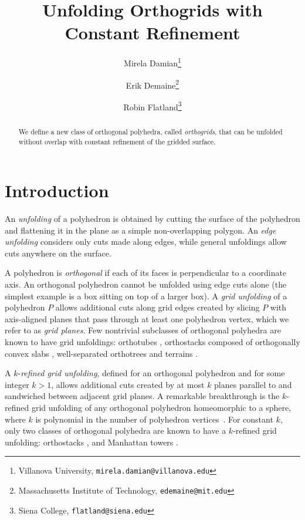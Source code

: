 \documentclass[11pt]{article}
\begin{document}
\title{Unfolding Orthogrids with Constant Refinement}
\author{
Mirela Damian\thanks{Villanova University, \tt{mirela.damian@villanova.edu}}
\and
Erik Demaine\thanks{Massachusetts Institute of Technology,  \tt{edemaine@mit.edu}}
\and
Robin Flatland\thanks{Siena College, \tt{flatland@siena.edu}}
}
\date{}
\maketitle


\begin{abstract}
We define a new class of orthogonal polyhedra, called \emph{orthogrids}, that can be unfolded without overlap with constant refinement of the gridded surface. 
\end{abstract}

\section{Introduction}
An \emph{unfolding} of a polyhedron is obtained by cutting the surface of the polyhedron and flattening it in the plane 
as a simple non-overlapping polygon. 
An \emph{edge unfolding} considers only cuts made along edges, while general unfoldings allow cuts anywhere on the surface. 

A polyhedron is \emph{orthogonal} if each of its faces is perpendicular to a coordinate axis.
An orthogonal polyhedron cannot be unfolded using edge cuts alone 
(the simplest example is a box sitting on top of a larger box). 
A \emph{grid unfolding} of a polyhedron $P$ allows additional cuts along grid edges created by slicing $P$ with 
axis-aligned planes that pass through at least one polyhedron vertex, which we refer to as \emph{grid planes}. Few nontrivial subclasses of orthogonal polyhedra are known to have grid unfoldings: orthotubes
\cite{Biedl-Demaine-Demaine-Lubiw-Overmars-O'Rourke-Robbins-Whitesides-1998},
orthostacks composed of orthogonally convex slabs
\cite{Damian-Meijer-2004-orthostacks}, 
well-separated orthotrees 
\cite{Damian-Flatland-Meijer-O'Rourke-2005-orthotrees} and
terrains
\cite{O'Rourke-2007-terrains}.

A $k$-\emph{refined grid unfolding}, defined for an orthogonal polyhedron and for some integer $k > 1$, allows additional cuts created by at most $k$ planes parallel to and sandwiched between adjacent grid planes. 
A remarkable breakthrough is the $k$-refined grid unfolding of any orthogonal polyhedron homeomorphic to a sphere, where $k$ is polynomial in the number of polyhedron vertices~\cite{Damian-Demaine-Flatland-2012-epsilon}.
For constant $k$, only two  classes of orthogonal polyhedra are known to have a $k$-refined grid unfolding: orthostacks
\cite{Biedl-Demaine-Demaine-Lubiw-Overmars-O'Rourke-Robbins-Whitesides-1998},
and Manhattan towers \cite{Damian-Flatland-O'Rourke-2008-manhattan}. 
\end{document}
